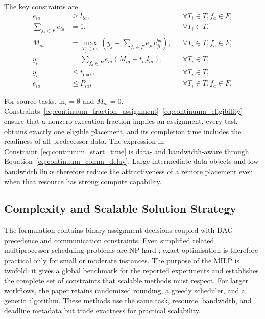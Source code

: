 The key constraints are
\begin{align}
 e_{ia} &\geq l_{ia}, &&\forall T_i\in T, f_a\in F, \label{eq:continuum_fraction_assignment}\\
 \sum_{f_a\in F}e_{ia} &=1, &&\forall T_i\in T, \label{eq:continuum_one_assignment}\\
 M_{ia} &=\max_{T_j\in\mathrm{in}_i}\left(y_j+\sum_{f_b\in F} e_{jb}c_{ji}^{ba}\right), &&\forall T_i\in T, f_a\in F, \label{eq:continuum_start_time}\\
 y_i &=\sum_{f_a\in F}e_{ia}\left(M_{ia}+t_{ia}l_{ia}\right), &&\forall T_i\in T, \label{eq:continuum_completion_time}\\
 y_i &\leq t_{\max}, &&\forall T_i\in T, \label{eq:continuum_deadline}\\
 e_{ia} &\leq P_{ia}, &&\forall T_i\in T, f_a\in F. \label{eq:continuum_eligibility}
\end{align}

For source tasks, $\mathrm{in}_i=\emptyset$ and $M_{ia}=0$. Constraints~\ref{eq:continuum_fraction_assignment}--\ref{eq:continuum_eligibility} ensure that a nonzero execution fraction implies an assignment, every task obtains exactly one eligible placement, and its completion time includes the readiness of all predecessor data. The expression in Constraint~\ref{eq:continuum_start_time} is data- and bandwidth-aware through Equation~\ref{eq:continuum_comm_delay}. Large intermediate data objects and low-bandwidth links therefore reduce the attractiveness of a remote placement even when that resource has strong compute capability.

\subsection{Complexity and Scalable Solution Strategy}

The formulation contains binary assignment decisions coupled with DAG precedence and communication constraints. Even simplified related multiprocessor scheduling problems are NP-hard \cite{lenstra1990approximation}; exact optimisation is therefore practical only for small or moderate instances. The purpose of the MILP is twofold: it gives a global benchmark for the reported experiments and establishes the complete set of constraints that scalable methods must respect. For larger workflows, the paper retains randomized rounding, a greedy scheduler, and a genetic algorithm. These methods use the same task, resource, bandwidth, and deadline metadata but trade exactness for practical scalability.

